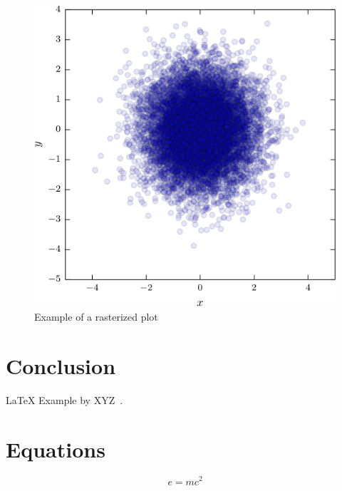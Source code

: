 \begin{figure}[H]
	\centering
	\includegraphics[width=0.9\columnwidth]{assets/figure_rasterized.pdf}
	\caption{Example of a rasterized plot}
\end{figure}

\lipsum[6] %

\section{Conclusion}\label{sec:conclusion}

\lipsum[7] %
\LaTeX{} Example by XYZ~\cite{doe2006test}.

\section{Equations}\label{sec:eq}
\begin{equation}
	\label{eq:emc}
	e = mc^2
\end{equation}



\printbibliography




